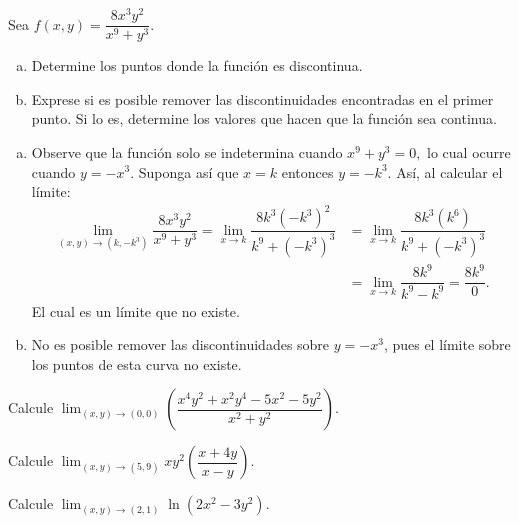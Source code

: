 \begin{prob}
Sea $f(x,y)=\dfrac{8x^3y^2}{x^9+y^3}.$
\begin{enumerate}[(a)]
    \item Determine los puntos donde la función es discontinua.
    \item Exprese si es posible remover las discontinuidades encontradas en el primer punto. Si lo es, determine los valores que hacen que la función sea continua. 
\end{enumerate}
\begin{myproof}
\begin{enumerate}[(a)]
\item Observe que la función solo se indetermina cuando $x^9+y^3=0,$ lo cual ocurre cuando $y=-x^3.$ Suponga así que  $x=k$ entonces $y=-k^3.$ Así, al calcular el límite:
 \begin{align*}
\displaystyle\lim_{(x,y)\to (k,-k^3)} \dfrac{8x^3y^2}{x^9+y^3} = \displaystyle\lim_{x\to k}\dfrac{8k^3(-k^3)^2}{k^9+(-k^3)^3}&=\displaystyle\lim_{x\to k}\dfrac{8k^3(k^6)}{k^9+(-k^3)^3}\\&=\displaystyle\lim_{x\to k}\dfrac{8k^9}{k^9-k^9}=\displaystyle\dfrac{8k^9}{0}.
\end{align*}
El cual es un límite que no existe.
\item No es posible remover las discontinuidades sobre $y=-x^3$, pues el límite sobre los puntos de esta curva no existe.
\end{enumerate}
\end{myproof}
\end{prob}

\begin{prob}
Calcule $\displaystyle\lim_{(x,y)\to (0,0)}\left(\dfrac{x^4y^2+x^2y^4-5x^2-5y^2}{x^2+y^2}\right).$
\end{prob}

\begin{prob}
Calcule $\displaystyle\lim_{(x,y)\to (5,9)}xy^2\left(\dfrac{x+4y}{x-y}\right).$
\end{prob}

\begin{prob}
Calcule $\displaystyle\lim_{(x,y)\to (2,1)}\ln\left(2x^2-3y^2\right).$
\end{prob}

